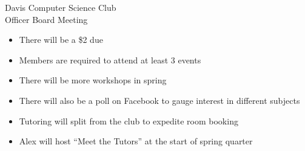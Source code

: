\documentclass{article}
\begin{document}
\begin{Minutes}{Davis Computer Science Club\\Officer Board Meeting}
\begin{itemize}
\item There will be a \$2 due
\item Members are required to attend at least 3 events
\end{itemize}

\begin{itemize}
\item There will be more workshops in spring
\item There will also be a poll on Facebook to gauge interest in different subjects
\end{itemize}

\begin{itemize}
\item Tutoring will split from the club to expedite room booking
\item Alex will host ``Meet the Tutors'' at the start of spring quarter
\end{itemize}
\thispagestyle{creditfooter}
\end{Minutes}
\end{document}
